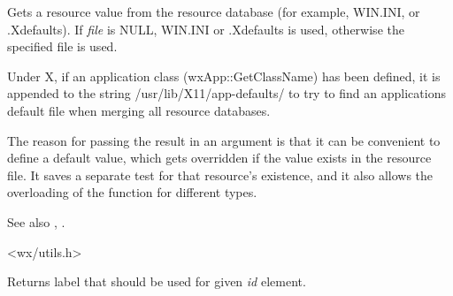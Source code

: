 \label{wxgetresource}





Gets a resource value from the resource database (for example, WIN.INI, or
.Xdefaults). If {\it file} is NULL, WIN.INI or .Xdefaults is used,
otherwise the specified file is used.

Under X, if an application class (wxApp::GetClassName) has been defined,
it is appended to the string /usr/lib/X11/app-defaults/ to try to find
an applications default file when merging all resource databases.

The reason for passing the result in an argument is that it
can be convenient to define a default value, which gets overridden
if the value exists in the resource file. It saves a separate
test for that resource's existence, and it also allows
the overloading of the function for different types.

See also , .


<wx/utils.h>


\label{wxgetstocklabel}


Returns label that should be used for given {\it id} element.



